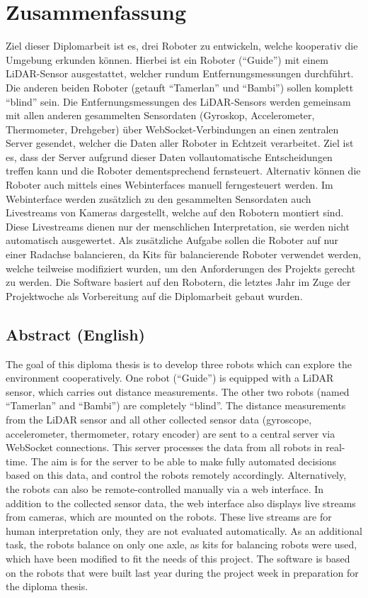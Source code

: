 
\chapter{Zusammenfassung}
Ziel dieser Diplomarbeit ist es, drei Roboter zu entwickeln,
welche kooperativ die Umgebung erkunden können.
%
Hierbei ist ein Roboter (``Guide'') mit einem LiDAR-Sensor ausgestattet,
welcher rundum Entfernungsmessungen durchführt.
%
Die anderen beiden Roboter (getauft ``Tamerlan'' und ``Bambi'')
sollen komplett ``blind'' sein.
%
Die Entfernungsmessungen des LiDAR-Sensors werden
gemeinsam mit allen anderen gesammelten Sensordaten
(Gyroskop, Accelerometer, Thermometer, Drehgeber)
über WebSocket-Verbindungen an einen zentralen Server gesendet,
welcher die Daten aller Roboter in Echtzeit verarbeitet.
%
Ziel ist es, dass der Server aufgrund dieser Daten
vollautomatische Entscheidungen treffen kann und die Roboter dementsprechend fernsteuert.
%
Alternativ können die Roboter auch mittels eines Webinterfaces manuell ferngesteuert werden.
%
Im Webinterface werden zusätzlich zu den gesammelten Sensordaten
auch Livestreams von Kameras dargestellt,
welche auf den Robotern montiert sind.
%
Diese Livestreams dienen nur der menschlichen Interpretation,
sie werden nicht automatisch ausgewertet.
%
Als zusätzliche Aufgabe sollen die Roboter auf nur einer Radachse balancieren,
da Kits für balancierende Roboter verwendet werden,
welche teilweise modifiziert wurden,
um den Anforderungen des Projekts gerecht zu werden.
%
Die Software basiert auf den Robotern,
die letztes Jahr im Zuge der Projektwoche als Vorbereitung auf die Diplomarbeit gebaut wurden.

\section{Abstract (English)}
The goal of this diploma thesis is to develop three robots which
can explore the environment cooperatively.
%
One robot (``Guide'') is equipped with a LiDAR sensor,
which carries out distance measurements.
%
The other two robots (named ``Tamerlan'' and ``Bambi'')
are completely ``blind''.
%
The distance measurements from the LiDAR sensor and all other collected sensor data
(gyroscope, accelerometer, thermometer, rotary encoder)
are sent to a central server via WebSocket connections.
%
This server processes the data from all robots in real-time.
%
The aim is for the server to be able to make fully automated decisions based on this data,
and control the robots remotely accordingly.
%
Alternatively, the robots can also be remote-controlled manually via a web interface.
%
In addition to the collected sensor data, the web interface
also displays live streams from cameras,
which are mounted on the robots.
%
These live streams are for human interpretation only,
they are not evaluated automatically.
%
As an additional task, the robots balance on only one axle,
as kits for balancing robots were used,
which have been modified to fit the needs of this project.
%
The software is based on the robots
that were built last year during the project week in preparation for the diploma thesis.